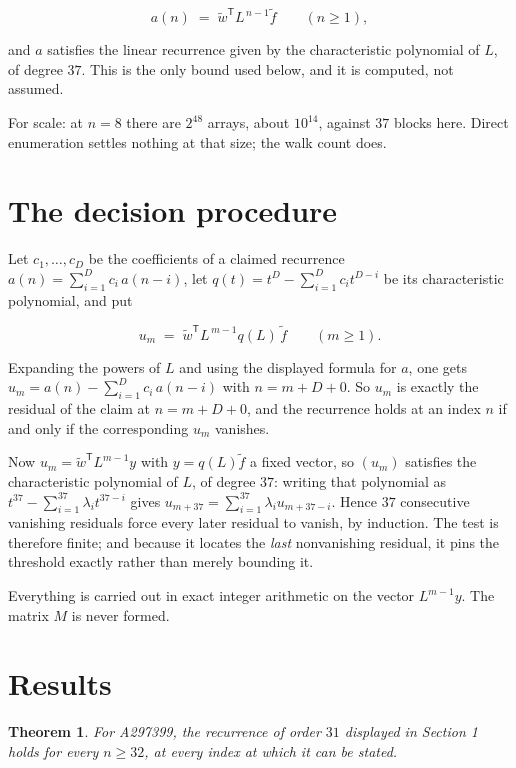 \documentclass[11pt]{article}
\newtheorem{theorem}{Theorem}
\theoremstyle{definition}
\begin{document}
\[a(n) \;=\; \tilde w^{\mathsf T} L^{\,n-1} \tilde f \qquad (n \ge 1),\]

and $a$ satisfies the linear recurrence given by the characteristic polynomial of $L$, of degree $37$. This is the only bound used below, and it is computed, not assumed.

For scale: at $n = 8$ there are $2^{48}$ arrays, about $10^{14}$, against $37$ blocks here. Direct enumeration settles nothing at that size; the walk count does.

\section{The decision procedure}

Let $c_1,\dots,c_D$ be the coefficients of a claimed recurrence $a(n) = \sum_{i=1}^{D} c_i\,a(n-i)$, let $q(t) = t^{D} - \sum_{i=1}^{D} c_i t^{D-i}$ be its characteristic polynomial, and put

\[u_m \;=\; \tilde w^{\mathsf T} L^{\,m-1} q(L)\,\tilde f \qquad (m \ge 1).\]

Expanding the powers of $L$ and using the displayed formula for $a$, one gets $u_m = a(n) - \sum_{i=1}^{D} c_i\,a(n-i)$ with $n = m + D + 0$. So $u_m$ is exactly the residual of the claim at $n = m + D + 0$, and the recurrence holds at an index $n$ if and only if the corresponding $u_m$ vanishes.

Now $u_m = \tilde w^{\mathsf T} L^{m-1} y$ with $y = q(L)\tilde f$ a fixed vector, so $(u_m)$ satisfies the characteristic polynomial of $L$, of degree $37$: writing that polynomial as $t^{37} - \sum_{i=1}^{37} \lambda_i t^{37-i}$ gives $u_{m+37} = \sum_{i=1}^{37} \lambda_i u_{m+37-i}$. Hence $37$ consecutive vanishing residuals force every later residual to vanish, by induction. The test is therefore finite; and because it locates the {\itshape last} nonvanishing residual, it pins the threshold exactly rather than merely bounding it.

Everything is carried out in exact integer arithmetic on the vector $L^{m-1}y$. The matrix $M$ is never formed.

\section{Results}

\begin{theorem} For A297399, the recurrence of order $31$ displayed in Section 1 holds for every $n \ge 32$, at every index at which it can be stated.\end{theorem}
\end{document}
